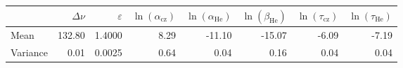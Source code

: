 \begin{tabular}{lrrrrrrr}
\toprule
 & $\Delta\nu$ & $\varepsilon$ & $\ln(\alpha_\mathrm{cz})$ & $\ln(\alpha_\mathrm{He})$ & $\ln(\beta_\mathrm{He})$ & $\ln(\tau_\mathrm{cz})$ & $\ln(\tau_\mathrm{He})$ \\
\midrule
Mean & 132.80 & 1.4000 & 8.29 & -11.10 & -15.07 & -6.09 & -7.19 \\
Variance & 0.01 & 0.0025 & 0.64 & 0.04 & 0.16 & 0.04 & 0.04 \\
\bottomrule
\end{tabular}
